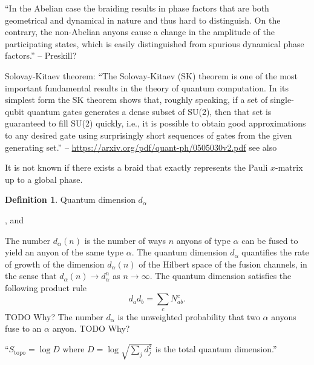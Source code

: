 \documentclass[a4paper,10pt,oneside]{book}
\theoremstyle{plain}
\theoremstyle{definition}
\newtheorem{definition}{Definition}[section]
\theoremstyle{remark}
\begin{document}
{``In the Abelian case the braiding results in phase factors that are both geometrical and dynamical in nature and thus hard to distinguish. On the contrary, the non-Abelian anyons cause a change in the amplitude of the participating states, which is easily distinguished from spurious dynamical phase factors.'' -- Preskill?

Solovay-Kitaev theorem:
``The Solovay-Kitaev (SK) theorem is one of the most important fundamental results in the
theory of quantum computation. In its simplest form the SK theorem shows that, roughly
speaking, if a set of single-qubit quantum gates generates a dense subset of SU(2), then that
set is guaranteed to fill SU(2) quickly, i.e., it is possible to obtain good approximations to
any desired gate using surprisingly short sequences of gates from the given generating set.'' -- \url{https://arxiv.org/pdf/quant-ph/0505030v2.pdf} see also \cite[Appendix 3]{nielsen chuang}


It is not known if there exists a braid that exactly represents the Pauli $x$-matrix up to a global phase. \cite[sec. 1.5]{wang book}

\begin{definition}{Quantum dimension $d_\alpha$}

  \cite{preskill}, and \cite[p. 388]{short intro fib}

  The number $d_\alpha(n)$ is the number of ways $n$ anyons of type $\alpha$ can be fused to yield an anyon of the same type $\alpha$. The quantum dimension $d_\alpha$ quantifies the rate of growth of the dimension $d_\alpha(n)$ of the Hilbert space of the fusion channels, in the sense that $d_\alpha(n) \to d_\alpha^n$ as $n\to\infty$. The quantum dimension satisfies the following product rule
  \begin{equation}\label{eq:quantum dimension product rule}
    d_a d_b = \sum_c N_{ab}^c.
  \end{equation}
  TODO Why?
  The number $d_\alpha$ is the unweighted probability that two $\alpha$ anyons fuse to an $\alpha$ anyon. TODO Why?
\end{definition}


``$S_{\text{topo}} = \log D$ where $D = \log \sqrt{\sum_j d_j^2}$ is the total quantum dimension.''









































}
\end{document}
